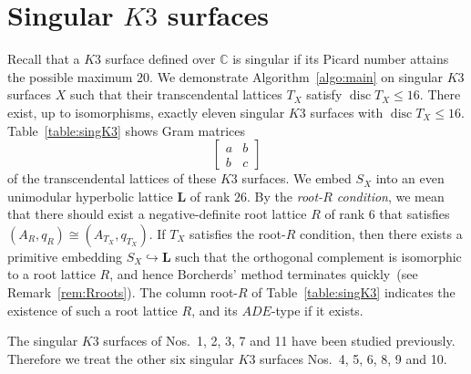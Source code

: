 \documentclass{amsart}
\theoremstyle{plain}
\theoremstyle{definition}
\theoremstyle{remark}
\numberwithin{equation}{section}
\numberwithin{table}{section}
\numberwithin{figure}{section}
\newcommand{\C}{\mathord{\mathbb C}}
\newcommand{\inj}{\hookrightarrow}
\newcommand{\disc}{\operatorname{\mathrm {disc}}\nolimits}
\renewcommand{\L}{\mathord{\mathbf{L}}}
\begin{document}
\section{Singular $K3$ surfaces}\label{sec:singK3}
%
Recall that a $K3$ surface defined over $\C$ is singular if its Picard number attains the possible maximum $20$.
We demonstrate Algorithm~\ref{algo:main} on 
singular $K3$ surfaces $X$ 
such that their transcendental lattices $T_X$ satisfy $\disc T_X\le 16$.
There exist, up to isomorphisms,  exactly eleven singular $K3$ surfaces with $\disc T_X\le 16$.
Table~\ref{table:singK3} shows
Gram matrices 
$$
\left[
\begin{array}{cc}
a & b \\
b & c
\end{array}
\right]
$$
of the transcendental lattices
of these $K3$ surfaces.
We embed $S_X$ into an even unimodular hyperbolic lattice $\L$ of rank $26$.
By the \emph{root-$R$ condition},
we mean 
that there should exist a negative-definite root lattice $R$ of rank $6$ that satisfies
$(A_{R}, q_{R})\cong (A_{T_X}, q_{T_X})$.
If $T_X$ satisfies the root-$R$ condition, 
then there exists a primitive embedding $S_X\inj \L$ such that 
the orthogonal complement is isomorphic to a root lattice $R$,
and hence Borcherds' method terminates quickly~(see Remark~\ref{rem:Rroots}).
The column root-$R$ of Table~\ref{table:singK3} indicates the existence of such a root lattice $R$,
and its $ADE$-type if it exists.
\par
The singular $K3$ surfaces of Nos.~{1, 2, 3, 7 and 11} have been studied previously.
Therefore we treat the other six singular $K3$ surfaces Nos.~{4, 5, 6, 8, 9 and 10}.
%
%
\end{document}
